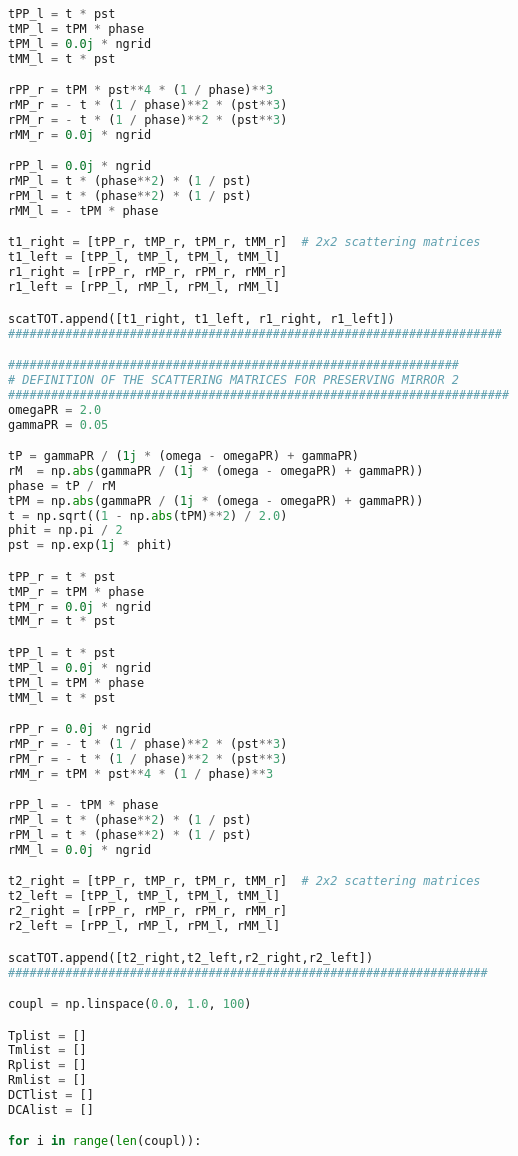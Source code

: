\documentclass[showpacs,aps,prl,onecolumn,superscriptaddress]{revtex4-1}
\begin{document}
\begin{lstlisting}[language=Python, caption=Script for Figure 15]
tPP_l = t * pst 
tMP_l = tPM * phase 
tPM_l = 0.0j * ngrid
tMM_l = t * pst 

rPP_r = tPM * pst**4 * (1 / phase)**3 
rMP_r = - t * (1 / phase)**2 * (pst**3) 
rPM_r = - t * (1 / phase)**2 * (pst**3) 
rMM_r = 0.0j * ngrid

rPP_l = 0.0j * ngrid
rMP_l = t * (phase**2) * (1 / pst)
rPM_l = t * (phase**2) * (1 / pst)
rMM_l = - tPM * phase

t1_right = [tPP_r, tMP_r, tPM_r, tMM_r]  # 2x2 scattering matrices
t1_left = [tPP_l, tMP_l, tPM_l, tMM_l]
r1_right = [rPP_r, rMP_r, rPM_r, rMM_r]
r1_left = [rPP_l, rMP_l, rPM_l, rMM_l]

scatTOT.append([t1_right, t1_left, r1_right, r1_left])
#####################################################################

###############################################################
# DEFINITION OF THE SCATTERING MATRICES FOR PRESERVING MIRROR 2
######################################################################
omegaPR = 2.0
gammaPR = 0.05

tP = gammaPR / (1j * (omega - omegaPR) + gammaPR)
rM  = np.abs(gammaPR / (1j * (omega - omegaPR) + gammaPR))
phase = tP / rM
tPM = np.abs(gammaPR / (1j * (omega - omegaPR) + gammaPR))
t = np.sqrt((1 - np.abs(tPM)**2) / 2.0)
phit = np.pi / 2
pst = np.exp(1j * phit)

tPP_r = t * pst
tMP_r = tPM * phase
tPM_r = 0.0j * ngrid
tMM_r = t * pst

tPP_l = t * pst
tMP_l = 0.0j * ngrid
tPM_l = tPM * phase
tMM_l = t * pst

rPP_r = 0.0j * ngrid
rMP_r = - t * (1 / phase)**2 * (pst**3) 
rPM_r = - t * (1 / phase)**2 * (pst**3) 
rMM_r = tPM * pst**4 * (1 / phase)**3

rPP_l = - tPM * phase
rMP_l = t * (phase**2) * (1 / pst)
rPM_l = t * (phase**2) * (1 / pst)
rMM_l = 0.0j * ngrid

t2_right = [tPP_r, tMP_r, tPM_r, tMM_r]  # 2x2 scattering matrices
t2_left = [tPP_l, tMP_l, tPM_l, tMM_l]
r2_right = [rPP_r, rMP_r, rPM_r, rMM_r]
r2_left = [rPP_l, rMP_l, rPM_l, rMM_l]

scatTOT.append([t2_right,t2_left,r2_right,r2_left])
###################################################################

coupl = np.linspace(0.0, 1.0, 100)

Tplist = []
Tmlist = []
Rplist = []
Rmlist = []
DCTlist = []
DCAlist = []

for i in range(len(coupl)):
    

\end{lstlisting}
\end{document}
